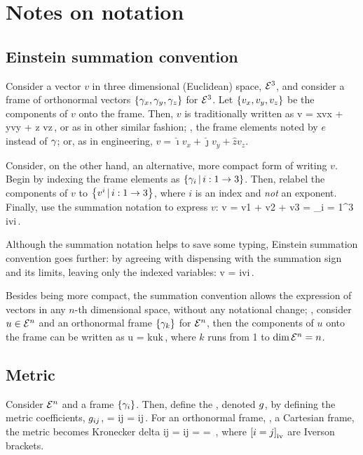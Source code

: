 \section{Notes on notation}

\subsection{Einstein summation convention}
Consider a vector $v$ in three dimensional (Euclidean) space, $\mathcal{\mathcal{E}}^{3}$, and consider a frame of orthonormal vectors $\left\lbrace{\gamma_{x}, \gamma_{y}, \gamma_{z}}\right\rbrace$ for $\mathcal{\mathcal{E}}^{3}$. Let $\left\lbrace{{v}_{x}, {v}_{y}, {v}_{z}}\right\rbrace$ be the components of $v$ onto the frame. Then, $v$ is traditionally written as
\beq
v = \fbvec x\rvec vx + \fbvec y\rvec vy + \fbvec z \rvec vz\,,
\eeq
or as in other similar fashion; \eg, the frame elements noted by $e$ instead of $\gamma_{}$; or, as in engineering, $v = \hat{\imath}v_x + \hat{\jmath}v_y + \hat{z}v_z$.

Consider, on the other hand, an alternative, more compact form of writing $v$. Begin by indexing the frame elements as $\left\lbrace{{\gamma_{i}}\,|\,{i:1\to 3}}\right\rbrace$. Then, relabel the components of $v$ to $\left\lbrace{{{v}^{i}}\,|\,{i:1\to 3}}\right\rbrace$, where $i$ is an index and \emph{not} an exponent. Finally, use the summation notation to express $v$:
\beq
v = \fvec v1 + \fvec v2 + \fvec v3 
  = \sum_{i = 1}^3 \fbvec i\fvec vi\,.
\eeq

Although the summation notation helps to save some typing, Einstein summation convention goes further: by agreeing with dispensing with the summation sign and its limits, leaving only the indexed variables:
\beq
v = \fbvec i\fvec vi\,.
\eeq

Besides being more compact, the summation convention allows the expression of vectors in any $n$-th dimensional space, without any notational change; \eg, consider $u\in\mathcal{\mathcal{E}}^{n}$ and an orthonormal frame $\left\lbrace{\gamma_{k}}\right\rbrace$ for $\mathcal{\mathcal{E}}^{n}$, then the components of $u$ onto the frame can be written as
\beq
u = \fbvec k\fvec uk\,,
\eeq
where $k$ runs from 1 to $\dim\mathcal{\mathcal{E}}^{n} = n$.


\subsection{Metric}
Consider $\mathcal{\mathcal{E}}^{n}$ and a frame $\left\lbrace{\gamma_{i}}\right\rbrace$. Then, define the , denoted $g$, by defining the metric coefficients, $g_{{i}{j}}$,
\beq
\met = \fmet ij = \fbvec i\iprod\fbvec j\,.
\eeq
For an orthonormal frame, \eg, a Cartesian frame, the metric becomes Kronecker delta
\beq
\fmet ij = \fkron ij =  = \diag{}\,,
\eeq
where $\left[i = j\right]_\text{iv}$ are Iverson brackets.


